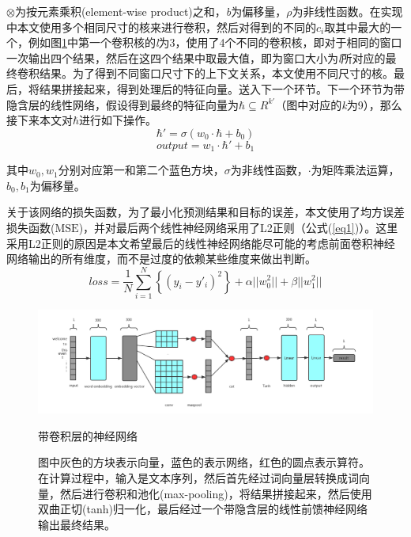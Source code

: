 \(\otimes\)为按元素乘积(element-wise product)之和，\textit{b}为偏移量，\(\rho\)为非线性函数。在实现中本文使用多个相同尺寸的核来进行卷积，然后对得到的不同的\(c_i\)取其中最大的一个，例如图\ref{f21}中第一个卷积核的\textit{l}为3，使用了4个不同的卷积核，即对于相同的窗口一次输出四个结果，然后在这四个结果中取最大值，即为窗口大小为\textit{l}所对应的最终卷积结果。为了得到不同窗口尺寸下的上下文关系，本文使用不同尺寸的核。最后，将结果拼接起来，得到处理后的特征向量。送入下一个环节。下一个环节为带隐含层的线性网络，假设得到最终的特征向量为\(\hbar\subseteq R^{k'}\)（图中对应的\textit{k}为9），那么接下来本文对\(\hbar\)进行如下操作。
\begin{equation}
\hbar'=\sigma(w_0\cdot\hbar+b_0)
\end{equation}
\begin{equation}
output = w_1\cdot\hbar'+b_1
\end{equation}

其中\(w_0,w_1\)分别对应第一和第二个蓝色方块，\(\sigma\)为非线性函数，\(\cdot\)为矩阵乘法运算，\(b_0,b_1\)为偏移量。

关于该网络的损失函数，为了最小化预测结果和目标的误差，本文使用了均方误差损失函数($\mathrm{MSE}$)，并对最后两个线性神经网络采用了L2正则（公式(\ref{eq1})）。这里采用L2正则的原因是本文希望最后的线性神经网络能尽可能的考虑前面卷积神经网络输出的所有维度，而不是过度的依赖某些维度来做出判断。
\begin{equation}\label{eq1}
loss=\frac{1}{N}\displaystyle\sum_{i=1}^{N}\left\{(y_i-y'_i)^2\right\}+\alpha||w_0^2||+\beta||w_1^2||
\end{equation}
\begin{figure}[htbp]
    \centering
    \includegraphics[width=16cm]{conv_ranker.png}
    \caption{带卷积层的神经网络}
    \captionsetup{font=footnotesize,margin=30pt}\caption*{图中灰色的方块表示向量，蓝色的表示网络，红色的圆点表示算符。在计算过程中，输入是文本序列，然后首先经过词向量层转换成词向量，然后进行卷积和池化(max-pooling)，将结果拼接起来，然后使用双曲正切(tanh)归一化，最后经过一个带隐含层的线性前馈神经网络输出最终结果。}
    \label{f21}
\end{figure} 

